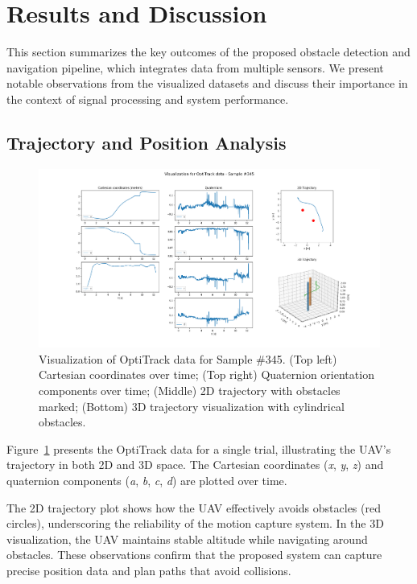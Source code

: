 \documentclass[12pt,a4paper]{article}
\begin{document}
\section{Results and Discussion}

This section summarizes the key outcomes of the proposed obstacle detection and navigation pipeline, which integrates data from multiple sensors. We present notable observations from the visualized datasets and discuss their importance in the context of signal processing and system performance.

\subsection{Trajectory and Position Analysis}

\begin{figure}[h!]
    \centering
    \includegraphics[width=\textwidth]{OptiTrack_sample_345.png}
    \caption{Visualization of OptiTrack data for Sample \#345. (Top left) Cartesian coordinates over time; (Top right) Quaternion orientation components over time; (Middle) 2D trajectory with obstacles marked; (Bottom) 3D trajectory visualization with cylindrical obstacles.}
    \label{fig:OptiTrack}
\end{figure}

Figure~\ref{fig:OptiTrack} presents the OptiTrack data for a single trial, illustrating the UAV's trajectory in both 2D and 3D space. The Cartesian coordinates (\textit{x}, \textit{y}, \textit{z}) and quaternion components (\textit{a}, \textit{b}, \textit{c}, \textit{d}) are plotted over time. 

The 2D trajectory plot shows how the UAV effectively avoids obstacles (red circles), underscoring the reliability of the motion capture system. In the 3D visualization, the UAV maintains stable altitude while navigating around obstacles. These observations confirm that the proposed system can capture precise position data and plan paths that avoid collisions.
\end{document}
